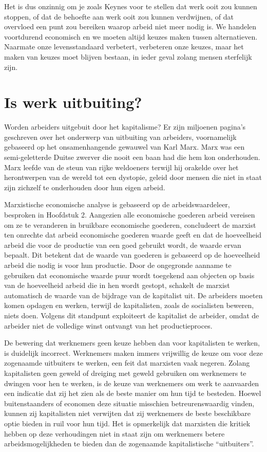 Het is dus onzinnig om je zoals Keynes voor te stellen dat werk
ooit zou kunnen stoppen, of dat de behoefte aan werk ooit zou kunnen
verdwijnen, of dat overvloed een punt zou bereiken waarop arbeid niet
meer nodig is. We handelen voortdurend economisch en we moeten altijd
keuzes maken tussen alternatieven. Naarmate onze levensstandaard
verbetert, verbeteren onze keuzes, maar het maken van keuzes moet
blijven bestaan, in ieder geval zolang mensen sterfelijk zijn.

\section{Is werk uitbuiting?}

Worden arbeiders uitgebuit door het kapitalisme? Er zijn miljoenen
pagina's geschreven over het onderwerp van uitbuiting
van arbeiders, voornamelijk gebaseerd op het onsamenhangende gewauwel
van Karl Marx. Marx was een semi-geletterde Duitse zwerver die nooit een
baan had die hem kon onderhouden. Marx leefde van de steun van rijke weldoeners 
terwijl hij orakelde over het herontwerpen van de wereld tot een dystopie, 
geleid door mensen die niet in staat zijn zichzelf te onderhouden door hun eigen arbeid.

Marxistische economische analyse is gebaseerd op de arbeidswaardeleer,
besproken in Hoofdstuk 2. Aangezien alle economische goederen arbeid
vereisen om ze te veranderen in bruikbare economische goederen,
concludeert de marxist ten onrechte dat arbeid economische goederen
waarde geeft en dat de hoeveelheid arbeid die voor de productie van een
goed gebruikt wordt, de waarde ervan bepaalt. Dit betekent dat de waarde
van goederen is gebaseerd op de hoeveelheid arbeid die nodig is voor hun
productie. Door de ongegronde aanname te gebruiken dat economische
waarde puur wordt toegekend aan objecten op basis van de hoeveelheid
arbeid die in hen wordt gestopt, schakelt de marxist automatisch de
waarde van de bijdrage van de kapitalist uit. De arbeiders moeten komen
opdagen en werken, terwijl de kapitalisten, zoals de socialisten
beweren, niets doen. Volgens dit standpunt exploiteert de kapitalist de
arbeider, omdat de arbeider niet de volledige winst ontvangt van het
productieproces.

De bewering dat werknemers geen keuze hebben dan voor kapitalisten te werken, is duidelijk incorrect. Werknemers maken immers vrijwillig de keuze om voor deze zogenaamde uitbuiters te werken, een feit dat marxisten vaak negeren. Zolang kapitalisten geen geweld of dreiging met geweld gebruiken om werknemers te dwingen voor hen te werken, is de keuze van werknemers om werk te aanvaarden een indicatie dat zij het zien als de beste manier om hun tijd te besteden. Hoewel buitenstaanders of economen deze situatie misschien betreurenswaardig vinden, kunnen zij kapitalisten niet verwijten dat zij werknemers de beste beschikbare optie bieden in ruil voor hun tijd. Het is opmerkelijk dat marxisten die kritiek hebben op deze verhoudingen niet in staat zijn om werknemers betere arbeidsmogelijkheden te bieden dan de zogenaamde kapitalistische ``uitbuiters''.

